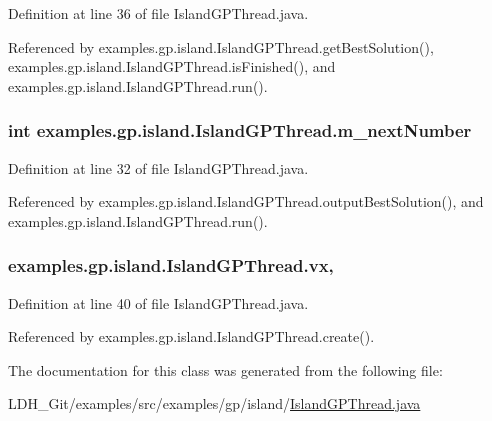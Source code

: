 Definition at line 36 of file Island\-G\-P\-Thread.\-java.



Referenced by examples.\-gp.\-island.\-Island\-G\-P\-Thread.\-get\-Best\-Solution(), examples.\-gp.\-island.\-Island\-G\-P\-Thread.\-is\-Finished(), and examples.\-gp.\-island.\-Island\-G\-P\-Thread.\-run().

\hypertarget{classexamples_1_1gp_1_1island_1_1_island_g_p_thread_a4493a37a4f8ca6d7b85d4ae274269869}{
\subsubsection[{m\-\_\-next\-Number}]{\setlength{\rightskip}{0pt plus 5cm}int examples.\-gp.\-island.\-Island\-G\-P\-Thread.\-m\-\_\-next\-Number\hspace{0.3cm}{\ttfamily [private]}}}\label{classexamples_1_1gp_1_1island_1_1_island_g_p_thread_a4493a37a4f8ca6d7b85d4ae274269869}


Definition at line 32 of file Island\-G\-P\-Thread.\-java.



Referenced by examples.\-gp.\-island.\-Island\-G\-P\-Thread.\-output\-Best\-Solution(), and examples.\-gp.\-island.\-Island\-G\-P\-Thread.\-run().

\hypertarget{classexamples_1_1gp_1_1island_1_1_island_g_p_thread_af169d491a3fa63979e3b6927b7d77976}{
\subsubsection[{vx}]{ examples.\-gp.\-island.\-Island\-G\-P\-Thread.\-vx\hspace{0.3cm}{\ttfamily [static]}, {\ttfamily [protected]}}}\label{classexamples_1_1gp_1_1island_1_1_island_g_p_thread_af169d491a3fa63979e3b6927b7d77976}


Definition at line 40 of file Island\-G\-P\-Thread.\-java.



Referenced by examples.\-gp.\-island.\-Island\-G\-P\-Thread.\-create().



The documentation for this class was generated from the following file\-:\begin{DoxyCompactItemize}
\item 
L\-D\-H\-\_\-\-Git/examples/src/examples/gp/island/\hyperlink{_island_g_p_thread_8java}{Island\-G\-P\-Thread.\-java}\end{DoxyCompactItemize}
